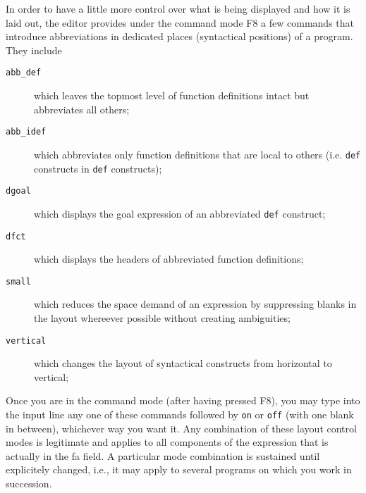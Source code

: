 In order to have a little more {\mys control} over what is being displayed and how it is laid
out, the editor provides under the command mode F8
a few commands that introduce abbreviations in dedicated places (syntactical positions)
of a program. 
They include
\begin{description}
\item[{\tt abb\_def}]  which leaves the topmost level of function definitions intact but abbreviates
all others;
\item[{\tt abb\_idef}] which abbreviates only function definitions that are local to
others (i.e. {\tt def} constructs in {\tt def} constructs);
\item[{\tt dgoal}] which displays the goal expression of an abbreviated {\tt def} construct;
\item[{\tt dfct}] which displays the headers of abbreviated function definitions;
\item[{\tt small}] which reduces the space demand of an expression by suppressing 
blanks in the layout whereever possible without creating ambiguities;
\item[{\tt vertical}] which changes the layout of syntactical constructs from
horizontal to vertical;
\end{description}

Once you are in the command mode (after having pressed F8), you may type into the input line any one of these
commands followed by {\tt on} or {\tt off} (with one blank in between), whichever way you want it.
Any combination of these {\mys layout control modes} is legitimate and applies to all components
of the expression that is actually in the {\sc fa} field. A particular
 mode combination is sustained until explicitely changed, i.e., it may apply to several programs
on which you work in succession.


